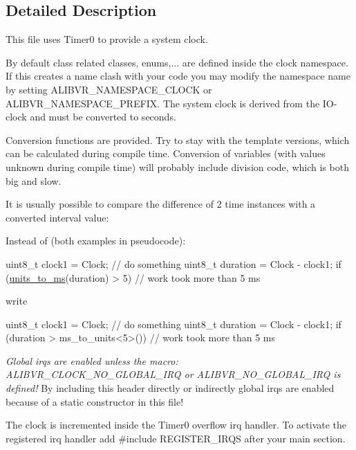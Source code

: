 \subsection{Detailed Description}
This file uses {\ttfamily Timer0} to provide a system clock. 

By default class related classes, enums,... are defined inside the {\ttfamily clock} namespace. If this creates a name clash with your code you may modify the namespace name by setting A\+L\+I\+B\+V\+R\+\_\+\+N\+A\+M\+E\+S\+P\+A\+C\+E\+\_\+\+C\+L\+O\+CK or A\+L\+I\+B\+V\+R\+\_\+\+N\+A\+M\+E\+S\+P\+A\+C\+E\+\_\+\+P\+R\+E\+F\+IX. The system clock is derived from the I\+O-\/clock and must be converted to seconds.

Conversion functions are provided. Try to stay with the template versions, which can be calculated during compile time. Conversion of variables (with values unknown during compile time) will probably include division code, which is both big and slow.

It is usually possible to compare the difference of 2 time instances with a converted interval value\+:

Instead of (both examples in pseudocode)\+:


\begin{DoxyCode}
uint8\_t clock1 = Clock;
\textcolor{comment}{// do something}
uint8\_t duration = Clock - clock1;
\textcolor{keywordflow}{if} (\hyperlink{namespaceclock_a64b11929624655a5ac990b12829c8606}{units\_to\_ms}(duration) > 5) \textcolor{comment}{// work took more than 5 ms}
\end{DoxyCode}


write


\begin{DoxyCode}
uint8\_t clock1 = Clock;
\textcolor{comment}{// do something}
uint8\_t duration = Clock - clock1;
\textcolor{keywordflow}{if} (duration > ms\_to\_units<5>()) \textcolor{comment}{// work took more than 5 ms}
\end{DoxyCode}


{\itshape Global irqs are enabled unless the macro\+: {\ttfamily A\+L\+I\+B\+V\+R\+\_\+\+C\+L\+O\+C\+K\+\_\+\+N\+O\+\_\+\+G\+L\+O\+B\+A\+L\+\_\+\+I\+RQ} or {\ttfamily A\+L\+I\+B\+V\+R\+\_\+\+N\+O\+\_\+\+G\+L\+O\+B\+A\+L\+\_\+\+I\+RQ} is defined!} By including this header directly or indirectly global irqs are enabled because of a static constructor in this file!

The clock is incremented inside the {\ttfamily Timer0} overflow irq handler. To activate the registered irq handler add {\ttfamily \#include R\+E\+G\+I\+S\+T\+E\+R\+\_\+\+I\+R\+QS} after your {\ttfamily main} section. 


